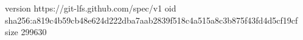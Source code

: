 version https://git-lfs.github.com/spec/v1
oid sha256:a819c4b59cb48e624d222dba7aab2839f518c4a515a8c3b875f43fd4d5cf19cf
size 299630
